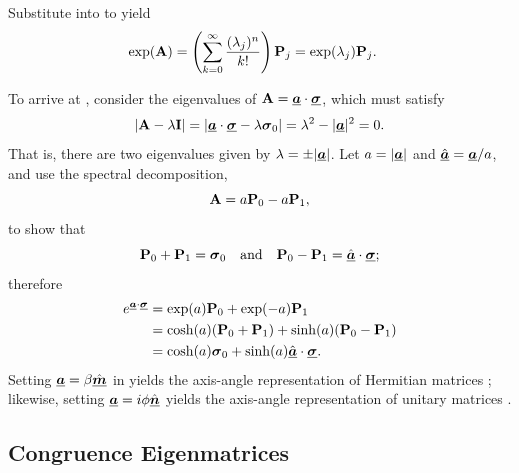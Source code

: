 \noindent
Substitute  into  to yield
\begin{align}
\exp({\bf A}) 
& = \left( \sum_{k=0}^\infty \frac{(\lambda_j)^n}{k!} \right) {\bf P}_j 
  = \exp(\lambda_j) {\bf P}_j.
\end{align}

To arrive at , consider the eigenvalues of 
${\bf A} = \underline{\mbox{\boldmath $a$}}\cdot\underline{\mbox{\boldmath $\sigma$}}$, which must satisfy
%
\begin{equation}
    |{\bf A} - \lambda {\bf I}| = \left|\underline{\mbox{\boldmath $a$}}\cdot\underline{\mbox{\boldmath $\sigma$}} - \lambda \mbox{\boldmath $\sigma$}_{0} \right| = \lambda^2 - |\underline{\mbox{\boldmath $a$}}|^2 = 0.
\end{equation}
That is, there are two eigenvalues given by $\lambda = \pm |\underline{\mbox{\boldmath $a$}}|$.
%
Let $a=|\underline{\mbox{\boldmath $a$}}|$ and $\hat{\underline{\mbox{\boldmath $a$}}}=\underline{\mbox{\boldmath $a$}}/a$, and use the spectral decomposition,
\begin{equation}
{\bf A} = a{\bf P}_0 -a{\bf P}_1,
\end{equation}
to show that
\begin{equation}
{\bf P}_0 + {\bf P}_1 = \mbox{\boldmath $\sigma$}_{0} \quad \text{and} \quad
{\bf P}_0 - {\bf P}_1 = \hat{\underline{\mbox{\boldmath $a$}}}\cdot\underline{\mbox{\boldmath $\sigma$}};
\end{equation}
therefore
\begin{align}
e^{\underline{\mbox{\scriptsize\boldmath $a$}}\cdot\underline{\mbox{\scriptsize\boldmath $\sigma$}}}
&= \exp(a) {\bf P}_0 + \exp(-a) {\bf P}_1 \nonumber \\
&= \cosh(a) ({\bf P}_0 + {\bf P}_1) 
+ \sinh(a)({\bf P}_0 - {\bf P}_1) \label{eqn:Pauli_exponential} \\
&= \cosh(a) \mbox{\boldmath $\sigma$}_{0}
+ \sinh(a) \hat{\underline{\mbox{\boldmath $a$}}}\cdot\underline{\mbox{\boldmath $\sigma$}}. \nonumber
\end{align}
%
Setting $\underline{\mbox{\boldmath $a$}} = \beta \hat{\underline{\mbox{\boldmath $m$}}}$ in  
yields the axis-angle representation of Hermitian matrices ;
likewise, setting $\underline{\mbox{\boldmath $a$}} = i \phi \hat{\underline{\mbox{\boldmath $n$}}}$ yields the axis-angle representation of unitary matrices .



\subsection{Congruence Eigenmatrices}
\label{app:symmetry}

